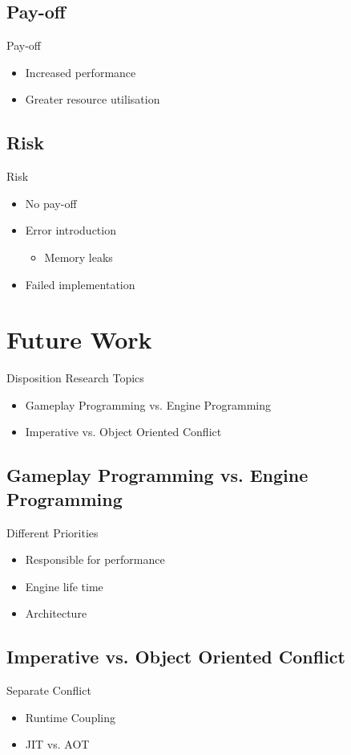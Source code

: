 \subsection{Pay-off}
\begin{frame}{\secname}{\subsecname}
	Pay-off
	\begin{itemize}
		\item Increased performance
		\item Greater resource utilisation
	\end{itemize}
\end{frame}

\subsection{Risk}
\begin{frame}{\secname}{\subsecname}
	Risk
	\begin{itemize}
		\item No pay-off
		\item Error introduction
		\begin{itemize}
			\item Memory leaks
		\end{itemize}
		\item Failed implementation
	\end{itemize}
\end{frame}

\section{Future Work}
\begin{frame}{\secname}{Disposition}
	Research Topics
	\begin{itemize}
		\item Gameplay Programming vs. Engine Programming
		\item Imperative vs. Object Oriented Conflict
	\end{itemize}
\end{frame}

\subsection{Gameplay Programming vs. Engine Programming}
\begin{frame}{\secname}{\subsecname}
	Different Priorities
	\begin{itemize}
		\item Responsible for performance
		\item Engine life time
		\item Architecture
	\end{itemize}
\end{frame}

\subsection{Imperative vs. Object Oriented Conflict}
\begin{frame}{\secname}{\subsecname}
	Separate Conflict
	\begin{itemize}
		\item Runtime Coupling
		\item JIT vs. AOT
	\end{itemize}
\end{frame}
